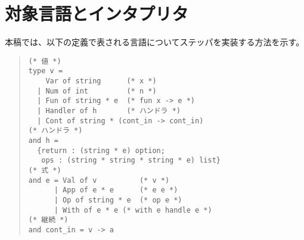 \section{対象言語とインタプリタ}
\label{lang}

本稿では、以下の定義で表される言語についてステッパを実装する方法を示す。
\begin{quote}
\begin{verbatim}
(* 値 *)
type v =
    Var of string      (* x *)
  | Num of int         (* n *)
  | Fun of string * e  (* fun x -> e *)
  | Handler of h       (* ハンドラ *)
  | Cont of string * (cont_in -> cont_in)
(* ハンドラ *)
and h =
  {return : (string * e) option;
   ops : (string * string * string * e) list}
(* 式 *)
and e = Val of v          (* v *)
      | App of e * e      (* e e *)
      | Op of string * e  (* op e *)
      | With of e * e (* with e handle e *)
(* 継続 *)
and cont_in = v -> a
\end{verbatim}
\end{quote}
